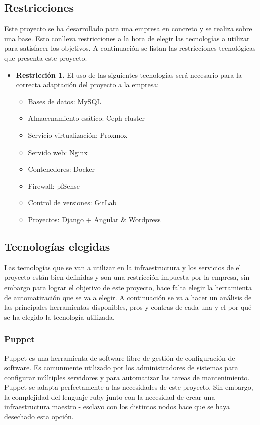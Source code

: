 	\subsection{Restricciones}
	\begin{text}
		Este proyecto se ha desarrollado para una empresa en concreto y se realiza sobre una base. Esto conlleva restricciones a la hora de elegir las tecnologías a utilizar para satisfacer los objetivos. A continuación se listan las restricciones tecnológicas que presenta este proyecto.
		
		\begin{itemize}
			\item \textbf{Restricción 1.} El uso de las siguientes tecnologías será necesario para la correcta adaptación del proyecto a la empresa:
			\begin{itemize}
				\item Bases de datos: MySQL
				\item Almacenamiento esático: Ceph cluster
				\item Servicio virtualización: Proxmox
				\item Servido web: Nginx
				\item Contenedores: Docker
				\item Firewall: pfSense
				\item Control de versiones: GitLab
				\item Proyectos: Django + Angular \& Wordpress
			\end{itemize}
		\end{itemize}
	\end{text}

	\subsection{Tecnologías elegidas}
	\begin{text}
		Las tecnologías que se van a utilizar en la infraestructura y los servicios de el proyecto están bien definidas y son una restricción impuesta por la empresa, sin embargo para lograr el objetivo de este proyecto, hace falta elegir la herramienta de automatización que se va a elegir. A continuación se va a hacer un análisis de las principales herramientas disponibles, pros y contras de cada una y el por qué se ha elegido la tecnología utilizada.
	\end{text}
	\subsubsection{Puppet}
	\begin{text}
		Puppet es una herramienta de software libre de gestión de configuración de software. Es comunmente utilizado por los administradores de sistemas para configurar múltiples servidores y para automatizar las tareas de mantenimiento. Puppet se adapta perfectamente a las necesidades de este proyecto. Sin embargo, la complejidad del lenguaje ruby junto con la necesidad de crear una infraestructura maestro - esclavo con los distintos nodos hace que se haya desechado esta opción.
	\end{text}
